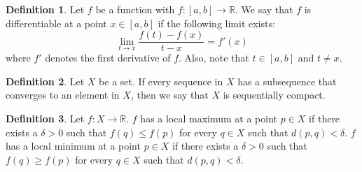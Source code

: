 \documentclass[12pt]{article}
\theoremstyle{definition}
\newtheorem{definition}{Definition}
\theoremstyle{named}
\begin{document}
\renewcommand{\thedefinition}{5.1}
\begin{definition}
    Let $f$ be a function with $f: [a,b] \to \mathbb{R}$. We say that $f$ is differentiable at a point $x \in [a,b]$ if the following limit exists: 
    $$
    \lim_{t \to x} \frac{f(t) - f(x)}{t-x} = f'(x)
    $$
    where $f'$ denotes the first derivative of $f$. Also, note that $t \in [a,b]$ and $t \neq x$. 
\end{definition}

\renewcommand{\thedefinition}{of Sequentially Compact}
\begin{definition}
    Let $X$ be a set. If every sequence in $X$ has a subsequence that converges to an element in $X$, then we say that $X$ is sequentially compact. 
\end{definition}

\renewcommand{\thedefinition}{5.7}
\begin{definition}
    Let $f: X \to \mathbb{R}$. $f$ has a local maximum at a point $p \in X$ if there exists a $\delta > 0$ such that $f(q) \leq f(p)$ for every $q \in X$ such that $d(p,q) < \delta$. $f$ has a local minimum at a point $p \in X$ if there exists a $\delta > 0$ such that $f(q) \geq f(p)$ for every $q \in X$ such that $d(p,q) < \delta$. 
\end{definition}
\end{document}
